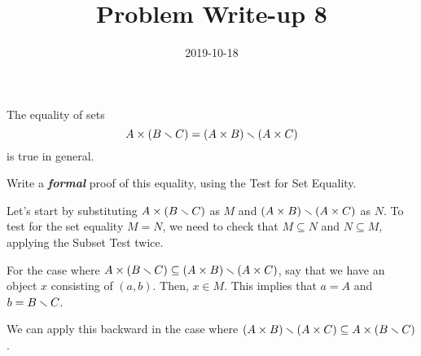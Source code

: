 \documentclass[a4paper,12pt]{article}
\title{Problem Write-up 8}
\date{2019-10-18}
\begin{document}
	\begin{problem}
		The equality of sets \[A \times (B \smallsetminus C) = (A \times B) \smallsetminus (A \times C)\] is true in general.
		
		Write a \textbf{\textit{formal}} proof of this equality, using the Test for Set Equality.	
	\end{problem}
	\begin{answer}
		Let's start by substituting \(A \times (B \smallsetminus C)\) as \(M\) and \((A \times B) \smallsetminus (A \times C)\) as \(N\). To test for the set equality \(M = N\), we need to check that \(M \subseteq N\) and \(N \subseteq M\), applying the Subset Test twice. 

		For the case where \(A \times (B \smallsetminus C) \subseteq (A \times B) \smallsetminus (A \times C)\), say that we have an object \(x\) consisting of \((a,b)\). Then, \(x \in M\). This implies that \(a = A\) and \(b = B \smallsetminus C\).

		We can apply this backward in the case where \((A \times B) \smallsetminus (A \times C) \subseteq A \times (B \smallsetminus C)\).
	\end{answer}
\end{document}
